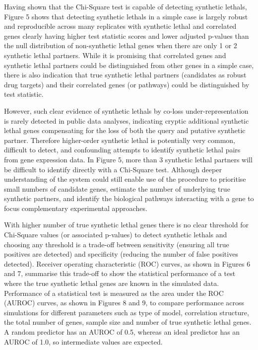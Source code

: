 Having shown that the Chi-Square test is capable of detecting \glspl{synthetic lethal}, Figure 5 shows that detecting \glspl{synthetic lethal} in a simple case is largely robust and reproducible across many replicates with \gls{synthetic lethal} and correlated genes clearly having higher test statistic scores and lower adjusted p-values than the null distribution of non-synthetic lethal genes when there are only 1 or 2 \gls{synthetic lethal} partners.  While it is promising that correlated genes and \gls{synthetic lethal} partners could be distinguished from other genes in a simple case, there is also indication that true \gls{synthetic lethal} partners (candidates as robust drug targets) and their correlated genes (or pathways) could be distinguished by test statistic.

However, such clear evidence of \glspl{synthetic lethal} by co-loss under-representation is rarely detected in public data analyses, indicating cryptic additional \gls{synthetic lethal} genes compensating for the loss of both the query and putative synthetic partner.  Therefore higher-order \gls{synthetic lethal} is potentially very common, difficult to detect, and confounding attempts to identify \gls{synthetic lethal} pairs from \gls{gene expression} data.  In Figure 5, more than 3 \gls{synthetic lethal} partners will be difficult to identify directly with a Chi-Square test.  Although deeper understanding of the system could still enable use of the procedure to prioritise small numbers of candidate genes, estimate the number of underlying true synthetic partners, and identify the biological pathways interacting with a gene to focus complementary experimental approaches.

With higher number of true \gls{synthetic lethal} genes there is no clear threshold for Chi-Square values (or associated p-values) to detect \glspl{synthetic lethal} and choosing any threshold is a trade-off between sensitivity (ensuring all true positives are detected) and specificity (reducing the number of false positives detected).  Receiver operating characteristic (ROC) curves, as shown in Figures 6 and 7, summarise this trade-off to show the statistical performance of a test where the true \gls{synthetic lethal} genes are known in the simulated data.  Performance of a statistical test is measured as the area under the \gls{ROC} (AUROC) curves, as shown in Figures 8 and 9, to compare performance across simulations for different parameters such as type of model, correlation structure, the total number of genes, sample size and number of true \gls{synthetic lethal} genes.  A random predictor has an \gls{AUROC} of 0.5, whereas an ideal predictor has an \gls{AUROC} of 1.0, so intermediate values are expected.

